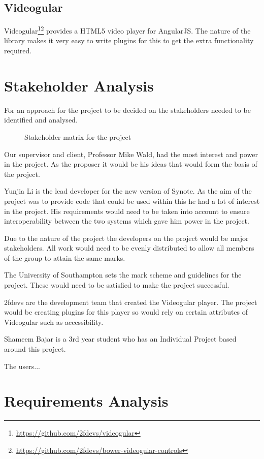 \subsection{Videogular}
\label{Section:Videogular}
\gls{Videogular}\footnote{\url{https://github.com/2fdevs/videogular}}\footnote{\url{https://github.com/2fdevs/bower-videogular-controls}} provides a HTML5 video player for \gls{AngularJS}. The nature of the library makes it very easy to write plugins for this to get the extra functionality required.

\section{Stakeholder Analysis}
For an approach for the project to be decided on the stakeholders needed to be identified and analysed. 
\begin{figure}[h!]
\centering

\caption{Stakeholder matrix for the project\label{fig:Stakeholder matrix}}
\end{figure}

Our supervisor and client, Professor Mike Wald, had the most interest and power in the project. As the proposer it would be his ideas that would form the basis of the project.

Yunjia Li is the lead developer for the new version of Synote. As the aim of the project was to provide code that could be used within this he had a lot of interest in the project. His requirements would need to be taken into account to ensure interoperability between the two systems which gave him power in the project.

Due to the nature of the project the developers on the project would be major stakeholders. All work would need to be evenly distributed to allow all members of the group to attain the same marks.

The University of Southampton sets the mark scheme and guidelines for the project. These would need to be satisfied to make the project successful.

2fdevs are the development team that created the \gls{Videogular} player. The project would be creating plugins for this player so would rely on certain attributes of \gls{Videogular} such as accessibility. 

Shameem Bajar is a 3rd year student who has an Individual Project based around this project. 

The users... 

\section{Requirements Analysis}
\label{Section:Requirements Analysis}

